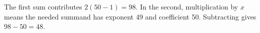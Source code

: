 The first sum contributes $ 2(50-1)=98 $. In the second, multiplication by $ x $ means the needed summand has exponent 49 and coefficient 50. Subtracting gives $\boxed{98-50=48}$.
